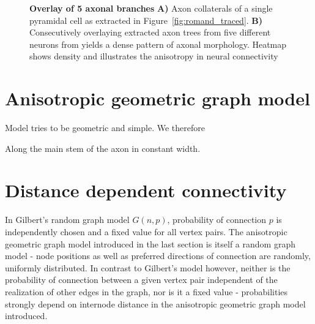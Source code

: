 \vspace{0.5cm}
\begin{figure}[!htbp]
  \vspace{0.3cm}
  \caption{\textbf{Overlay of 5 axonal branches} \textbf{A)} Axon
      collaterals of a single pyramidal cell as extracted in
      Figure~\ref{fig:romand_traced}. \textbf{B)} Consecutively
      overlaying extracted axon trees from five different neurons from
      \textcite{Romand2011} yields a dense pattern of axonal
      morphology. Heatmap shows density and illustrates the anisotropy
      in neural connectivity}%
  \label{fig:dendrite_heat}
\end{figure}






\clearpage
\section{Anisotropic geometric graph model}\label{sec:network_model}

Model tries to be geometric and simple. We therefore

Along the main stem of the axon in constant width. %

\newpage
\section{Distance dependent connectivity}\label{sec:dist_depend_con}

In Gilbert's random graph model $G(n,p)$, 
probability of connection $p$ is independently chosen and a fixed
value for all vertex pairs. The anisotropic geometric graph model
introduced in the last %
section is itself a random graph model - node positions as well as
preferred directions of connection are randomly, uniformly
distributed. In contrast to Gilbert's model however, neither is the
probability of connection between a given vertex pair independent of
the realization of other edges in the graph, nor is it a fixed value -
probabilities strongly depend on internode distance in the
anisotropic geometric graph model introduced.

